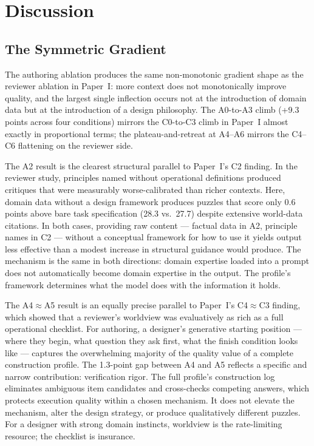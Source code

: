 \section{Discussion}

\subsection{The Symmetric Gradient}

The authoring ablation produces the same non-monotonic gradient shape as the reviewer ablation in Paper~I: more context does not monotonically improve quality, and the largest single inflection occurs not at the introduction of domain data but at the introduction of a design philosophy. The A0-to-A3 climb (+9.3 points across four conditions) mirrors the C0-to-C3 climb in Paper~I almost exactly in proportional terms; the plateau-and-retreat at A4–A6 mirrors the C4–C6 flattening on the reviewer side.

The A2 result is the clearest structural parallel to Paper~I's C2 finding. In the reviewer study, principles named without operational definitions produced critiques that were measurably worse-calibrated than richer contexts. Here, domain data without a design framework produces puzzles that score only 0.6 points above bare task specification (28.3 vs.\ 27.7) despite extensive world-data citations. In both cases, providing raw content — factual data in A2, principle names in C2 — without a conceptual framework for how to use it yields output less effective than a modest increase in structural guidance would produce. The mechanism is the same in both directions: domain expertise loaded into a prompt does not automatically become domain expertise in the output. The profile's framework determines what the model does with the information it holds.

The A4$\approx$A5 result is an equally precise parallel to Paper~I's C4$\approx$C3 finding, which showed that a reviewer's worldview was evaluatively as rich as a full operational checklist. For authoring, a designer's generative starting position — where they begin, what question they ask first, what the finish condition looks like — captures the overwhelming majority of the quality value of a complete construction profile. The 1.3-point gap between A4 and A5 reflects a specific and narrow contribution: verification rigor. The full profile's construction log eliminates ambiguous item candidates and cross-checks competing answers, which protects execution quality within a chosen mechanism. It does not elevate the mechanism, alter the design strategy, or produce qualitatively different puzzles. For a designer with strong domain instincts, worldview is the rate-limiting resource; the checklist is insurance.

